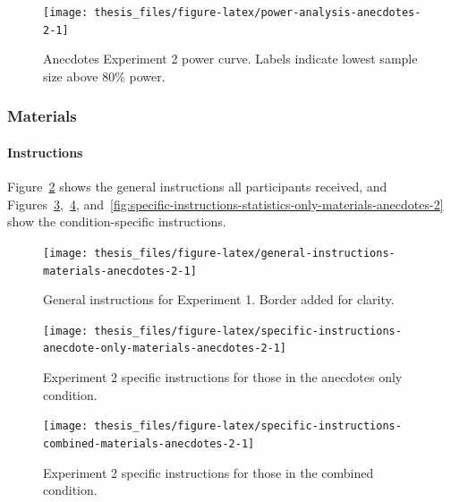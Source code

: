 \documentclass[a4paper, nobind, dvipsnames]{templates/ociamthesis}
\theoremstyle{definition}
\theoremstyle{definition}
\theoremstyle{definition}
\theoremstyle{definition}
\theoremstyle{remark}
\begin{document}
\newpage

\begin{landscape}



\begin{figure}
\texttt{[image: thesis\_files/figure-latex/power-analysis-anecdotes-2-1]} \caption{Anecdotes Experiment 2 power curve. Labels indicate lowest sample size above 80\% power.}\label{fig:power-analysis-anecdotes-2}
\end{figure}

\end{landscape}

\newpage

\subsubsection{Materials}

\hypertarget{instructions-materials-anecdotes-2-appendix}{%
\paragraph{Instructions}\label{instructions-materials-anecdotes-2-appendix}}

Figure~\ref{fig:general-instructions-materials-anecdotes-2} shows the general
instructions all participants received, and
Figures~\ref{fig:specific-instructions-anecdote-only-materials-anecdotes-2},~\ref{fig:specific-instructions-combined-materials-anecdotes-2},
and~\ref{fig:specific-instructions-statistics-only-materials-anecdotes-2} show
the condition-specific instructions.



\begin{figure}
\texttt{[image: thesis\_files/figure-latex/general-instructions-materials-anecdotes-2-1]} \caption{General instructions for Experiment 1. Border added for clarity.}\label{fig:general-instructions-materials-anecdotes-2}
\end{figure}



\begin{figure}
\texttt{[image: thesis\_files/figure-latex/specific-instructions-anecdote-only-materials-anecdotes-2-1]} \caption{Experiment 2 specific instructions for those in the anecdotes only condition.}\label{fig:specific-instructions-anecdote-only-materials-anecdotes-2}
\end{figure}



\begin{figure}
\texttt{[image: thesis\_files/figure-latex/specific-instructions-combined-materials-anecdotes-2-1]} \caption{Experiment 2 specific instructions for those in the combined condition.}\label{fig:specific-instructions-combined-materials-anecdotes-2}
\end{figure}
\end{document}
